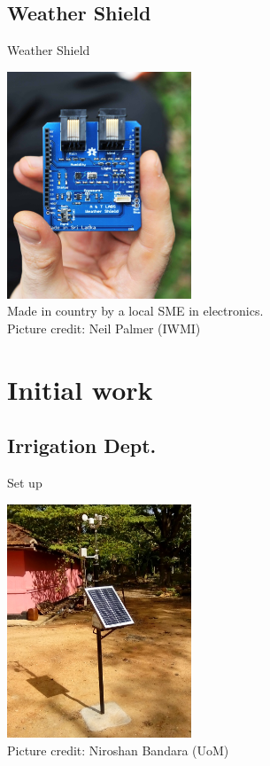 \documentclass[xcolor=dvipsnames,beamer,unknownkeysallowed]{beamer} %
\begin{document}
\subsection{Weather Shield}
\begin{frame}[fragile]{Weather Shield}

\begin{center}
 \includegraphics[width=5.5cm]{WeatherShield}\\
\vspace{5mm}
Made in country by a local SME in electronics.\\
Picture credit: Neil Palmer (IWMI)
\end{center}

\end{frame}

\section{Initial work}
\subsection{Irrigation Dept.}
\begin{frame}[fragile]{Set up}

\begin{center}
 \includegraphics[width=5.5cm]{IMG_20140902_151739}\\
\vspace{5mm}
Picture credit: Niroshan Bandara (UoM)
\end{center}

\end{frame}
\end{document}
